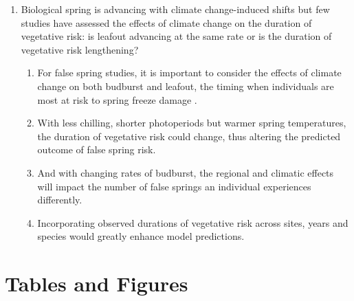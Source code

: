 \documentclass{article}\usepackage[]{graphicx}\usepackage[]{color}
\begin{document}
\begin{enumerate}
\item Biological spring is advancing with climate change-induced shifts but few studies have assessed the effects of climate change on the duration of vegetative risk: is leafout advancing at the same rate or is the duration of vegetative risk lengthening?
  \begin{enumerate}
  \item For false spring studies, it is important to consider the effects of climate change on both budburst and leafout, the timing when individuals are most at risk to spring freeze damage \citep{Lenz2016}.
  \item With less chilling, shorter photoperiods but warmer spring temperatures, the duration of vegetative risk could change, thus altering the predicted outcome of false spring risk.
  \item And with changing rates of budburst, the regional and climatic effects will impact the number of false springs an individual experiences differently.
  \item Incorporating observed durations of vegetative risk across sites, years and species would greatly enhance model predictions. 



  
  
  
  
  
  
  \end{enumerate}
\end{enumerate}
%




\section*{Tables and Figures} %
\end{document}
